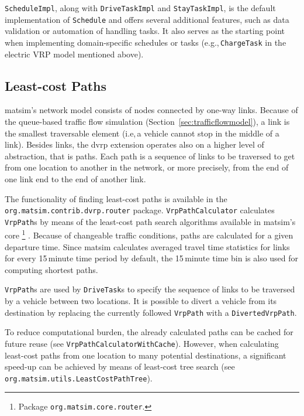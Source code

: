 \lstinline$ScheduleImpl$, along with \lstinline$DriveTaskImpl$ and \lstinline$StayTaskImpl$, is the default implementation of \lstinline$Schedule$ and offers several additional features, such as data validation or automation of handling tasks. It also serves as the starting point when implementing domain-specific schedules or tasks (e.g.,\,\lstinline$ChargeTask$ in the electric VRP model mentioned above).

\subsection{Least-cost Paths}
\label{sec:VRP-router}

\gls{matsim}'s network model consists of nodes connected by one-way links. Because of the queue-based traffic flow simulation (Section~\ref{sec:trafficflowmodel}), a link is the smallest traversable element (i.e,\,a vehicle cannot stop in the middle of a link). Besides links, the \gls{dvrp} extension operates also on a higher level of abstraction, that is paths. Each path is a sequence of links to be traversed to get from one location to another in the network, or more precisely, from the end of one link end to the end of another link. 

The functionality of finding least-cost paths is available in the \lstinline$org.matsim.contrib.dvrp.router$ package. \lstinline$VrpPathCalculator$ calculates \lstinline$VrpPath$s by means of the least-cost path search algorithms available in \gls{matsim}'s core%
\footnote{
Package \lstinline$org.matsim.core.router$.
}
\citep{JacobMaratheEtAl1999computationalstudyof,LefebvreBalmer2007Fastshortestpath}. Because of changeable traffic conditions, paths are calculated for a given departure time. Since \gls{matsim} calculates averaged travel time statistics for links for every 15\,minute time period by default, the 15\,minute time bin is also used for computing shortest paths.

\lstinline$VrpPath$s are used by \lstinline$DriveTask$s to specify the sequence of links to be traversed by a vehicle between two locations. It is possible to divert a vehicle from its destination by replacing the currently followed \lstinline$VrpPath$ with a \lstinline$DivertedVrpPath$.

To reduce computational burden, the already calculated paths can be cached for future reuse (see \lstinline$VrpPathCalculatorWithCache$). However, when calculating least-cost paths from one location to many potential destinations, a significant speed-up can be achieved by means of least-cost tree search (see \lstinline$org.matsim.utils.LeastCostPathTree$).

